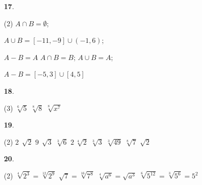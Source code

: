 \documentclass[a4paper, pdf, twoside]{book}
\begin{document}
\begin{multicols}{2}
\begin{enumerate}

 \item[\fontfamily{phv}\selectfont\color{blue}\textbf{17}. ] 
 \begin{tasks}[column-sep=1em, item-indent=1.3333em](2)
	 \task* $A\cap B=\emptyset $;\par $A\cup B=[-11,-9] \cup (-1,6)$;\par $A-B=A$
	 \task* $A\cap B=B$; $A\cup B=A$;\par $A-B=[-5,3]\cup [4,5]$
\end{tasks}
\vspace{0.25cm}



 \item[\fontfamily{phv}\selectfont\color{blue}\textbf{18}. ]  \scalebox{0.6}{\simbolclau } 
 \begin{tasks}[column-sep=1em, item-indent=1.3333em](3)
	 \task $\sqrt [{6}]{5} $
	 \task $\sqrt [{8}]{8} $
	 \task $\sqrt [{8}]{x^{7} } $
\end{tasks}
\vspace{0.25cm}



 \item[\fontfamily{phv}\selectfont\color{blue}\textbf{19}. ]  \scalebox{0.6}{\simbolclau } 
 \begin{tasks}[column-sep=1em, item-indent=1.3333em](2)
	 \task $2\,\sqrt [{}]{2} $
	 \task $9\,\sqrt [{}]{3} $
	 \task $\sqrt [{3}]{6} $
	 \task $2\,\sqrt [{4}]{2} $
	 \task $\sqrt [{3}]{3} $
	 \task $\sqrt [{3}]{49} $
	 \task $\sqrt [{8}]{7} $
	 \task $\sqrt {2} $
\end{tasks}
\vspace{0.25cm}



 \item[\fontfamily{phv}\selectfont\color{blue}\textbf{20}. ]  \scalebox{0.6}{\simbolclau } 
 \begin{tasks}[column-sep=1em, item-indent=1.3333em](2)
	 \task* $\sqrt [{4}]{2^{3} } =\sqrt [{12}]{2^{9} } $
	 \task* $\sqrt {7} =\sqrt [{16}]{7^{8} } $
	 \task* $\sqrt [{4}]{a^{6} } =\sqrt {a^{3} } $
	 \task* $\sqrt [{6}]{5^{12} } =\sqrt [{3}]{5^{6} } =5^{2} $
\end{tasks}
 \end{enumerate}
\vspace{0.3cm}



\end{multicols}
\end{document}
